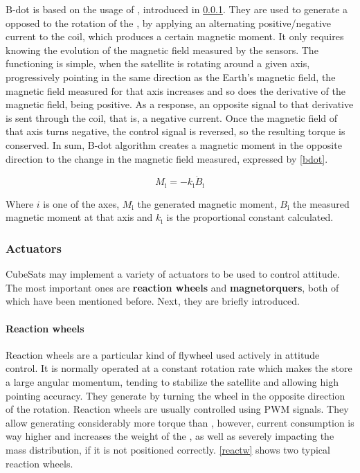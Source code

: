 B-dot is based on the usage of , introduced in \ref{actuators}. They are used to generate a  opposed to the rotation of the , by applying an alternating positive/negative current to the coil, which produces a certain magnetic moment. It only requires knowing the evolution of the magnetic field measured by the sensors. The functioning is simple, when the satellite is rotating around a given axis, progressively pointing in the same direction as the Earth's magnetic field, the magnetic field measured for that axis increases and so does the derivative of the magnetic field, being positive. As a response, an opposite signal to that derivative is sent through the coil, that is, a negative current. Once the magnetic field of that axis turns negative, the control signal is reversed, so the resulting torque is conserved. In sum, B-dot algorithm creates a magnetic moment in the opposite direction to the change in the magnetic field measured, expressed by \autoref{bdot}.

\begin{equation}\label{bdot}
M_\text{i}=-k_\text{i}\dot{B}_\text{i}
\end{equation}

Where $i$ is one of the axes, $M_\text{i}$ the generated magnetic moment, $B_\text{i}$ the measured magnetic moment at that axis and $k_\text{i}$ is the proportional constant calculated. 
			
\subsubsection{Actuators} \label{actuators}

CubeSats may implement a variety of actuators to be used to control attitude. The most important ones are \textbf{reaction wheels} and \textbf{magnetorquers}, both of which have been mentioned before. Next, they are briefly introduced.

\paragraph{Reaction wheels}

Reaction wheels are a particular kind of flywheel used actively in attitude control. It is normally operated at a constant rotation rate which makes the  store a large angular momentum, tending to stabilize the satellite and allowing high pointing accuracy. They generate  by turning the wheel in the opposite direction of the rotation. Reaction wheels are usually controlled using \acrshort{PWM} signals. They allow generating considerably more torque than , however, current consumption is way higher and increases the weight of the , as well as severely impacting the mass distribution, if it is not positioned correctly. \autoref{reactw} shows two typical  reaction wheels.

